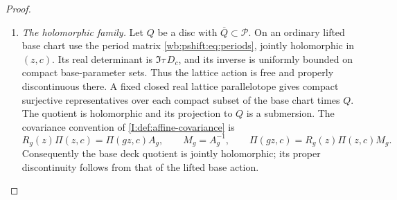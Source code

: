 \begin{proof}
\begin{enumerate}[label=\arabic*.,leftmargin=*]
On a finite overlap, write the marked gluing as
$h_{j,c}(\zeta)=\zeta+\sigma_{j,c}$. Then (PS17), (PS26), and
(PS27) give the equality of torus maps
\[
                     h_{j,c+n}F_j=F_{\mathrm{mid}}h_{j,c}.
 \tag{PS28}\hypertarget{tag-03CC}{}\label{wb:pshift:eq:finite-overlap-identity}
\]
Both sides add
$\sigma_{j,c}+a=\sigma_{j,c+n}+b_j+\eta_j$.
On the cusp overlap the marked map is exponentiation of $\zeta$;
(PS22) and (PS26) give
$\exp(2\pi ia)=t_c^{q_n}\exp(2\pi i\eta_0)$, exactly the
third line of (PS27). Thus that overlap also agrees, including
all nonconstant period units. The maps and their inverses glue to
a global biholomorphism $X_c\to X_{c+n}$ over $B$.

The choices can be made coherently for every parameter and every even
shift. Both initial cocycle columns in (PS13) have $\gamma=0$.
Because every $A_g$ preserves $\gamma$, (PS20) shows that
$\gamma(\ell_g)=0$ for every word. Therefore the affine term
$\Pi_c(gz)\ell_g$ in (PS23) is independent of $c$. The displayed
$a_j,a_0$, and the vector sheaf $\mathscr V$ are also independent
of $c$. Perform the additive construction once for $n=2$, keeping
one resulting section $a^{(2)}$. For $n=2k$ choose
$a^{(2k)}=k a^{(2)}$ and multiply its local correcting vectors by
$k$. All their affine cocycles and local formulas are then exactly
those for $n=2k$. The resulting maps satisfy the full group law
\[
 F_{2h,c+2k}\circ F_{2k,c}=F_{2(h+k),c},\qquad
                 F_{0,c}=\mathrm{id}_{X_c}.
 \tag{PS28a}\hypertarget{tag-03C1}{}\label{wb:pshift:eq:coherent-shift-action}
\]
This follows by adding the translation vectors in the first
two lines of (PS27), and by multiplying their units and adding the
integer exponents in its third line. The formulas are jointly
holomorphic in $c$, since their corrections are independent of it.
\item \emph{The holomorphic family.}
Let $Q$ be a disc with $\overline Q\subset\mathcal P$.
On an ordinary lifted base chart use the period matrix
\eqref{wb:pshift:eq:periods}, jointly holomorphic in $(z,c)$.
Its real determinant is $\Im\tau\,D_c$, and its inverse is
uniformly bounded on compact base-parameter sets. Thus the lattice
action is free and properly discontinuous there. A fixed closed
real lattice parallelotope gives compact surjective representatives
over each compact subset of the base chart times $Q$.
The quotient is holomorphic and its projection to $Q$ is a submersion.
The covariance convention of \cref{I:def:affine-covariance} is
\[
 R_g(z)\Pi(z,c)=\Pi(gz,c)A_g,
 \qquad M_g=A_g^{-1},\qquad
 \Pi(gz,c)=R_g(z)\Pi(z,c)M_g.
\]
Consequently the base deck quotient is jointly holomorphic; its
proper discontinuity follows from that of the lifted base action.


\end{enumerate}
\end{proof}
